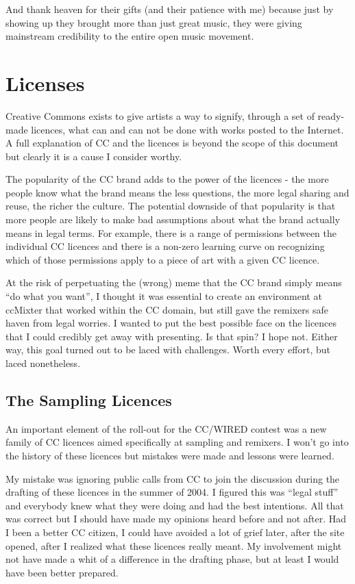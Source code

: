 And thank heaven for their gifts (and their patience with me) because just by
showing up they brought more than just great music, they were giving mainstream
credibility to the entire open music movement.



\section{Licenses}
\label{s:unexpected_collaboration:licenses}

Creative Commons exists to give artists a way to signify, through a set of
ready-made licences, what can and can not be done with works posted to the
Internet. A full explanation of CC and the licences is beyond the scope of this
document but clearly it is a cause I consider worthy.

The popularity of the CC brand adds to the power of the licences - the more
people know what the brand means the less questions, the more legal sharing and
reuse, the richer the culture. The potential downside of that popularity is that
more people are likely to make bad assumptions about what the brand actually
means in legal terms. For example, there is a range of permissions between the
individual CC licences and there is a non-zero learning curve on recognizing
which of those permissions apply to a piece of art with a given CC licence.

At the risk of perpetuating the (wrong) meme that the CC brand simply means ``do
what you want'', I thought it was essential to create an environment at ccMixter
that worked within the CC domain, but still gave the remixers safe haven from
legal worries. I wanted to put the best possible face on the licences that I
could credibly get away with presenting. Is that spin? I hope not. Either way,
this goal turned out to be laced with challenges. Worth every ef\hbox{}fort, but laced
nonetheless.


\subsection{The Sampling Licences}
\label{ss:unexpected_collaboration:license:sampling_licenses}

An important element of the roll-out for the CC/WIRED contest was a new family
of CC licences aimed specif\hbox{}ically at sampling and remixers. I won't go into the
history of these licences but mistakes were made and lessons were learned.

My mistake was ignoring public calls from CC to join the discussion during the
drafting of these licences in the summer of 2004. I f\hbox{}igured this was ``legal
stuf\hbox{}f'' and everybody knew what they were doing and had the best intentions. All
that was correct but I should have made my opinions heard before and not after.
Had I been a better CC citizen, I could have avoided a lot of grief later, after
the site opened, after I realized what these licences really meant. My
involvement might not have made a whit of a dif\hbox{}ference in the drafting phase,
but at least I would have been better prepared.

